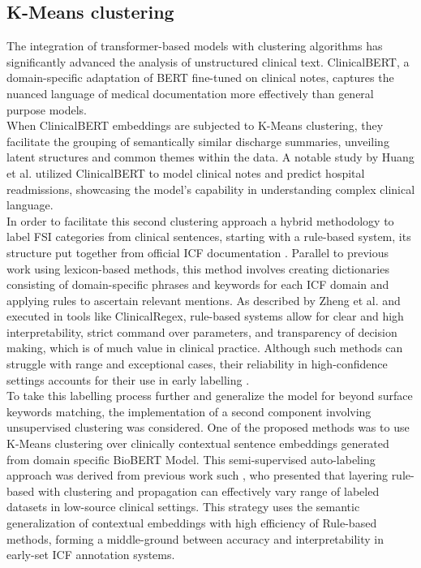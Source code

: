 \subsection{K-Means clustering}
The integration of transformer-based models with clustering algorithms has significantly advanced the analysis of unstructured clinical text. ClinicalBERT, a domain-specific adaptation of BERT fine-tuned on clinical notes, captures the nuanced language of medical documentation more effectively than general purpose models. \\

When ClinicalBERT embeddings are subjected to K-Means clustering, they facilitate the grouping of semantically similar discharge summaries, unveiling latent structures and common themes within the data. A notable study by Huang et al. \cite{huang2019} utilized ClinicalBERT to model clinical notes and predict hospital readmissions, showcasing the model's capability in understanding complex clinical language. \\

In order to facilitate this second clustering approach a hybrid methodology to label FSI categories from clinical sentences, starting with a rule-based system, its structure put together from official ICF documentation \cite{CommCognitionGuideline2023, InterpersonalGuideline2023, MobilityGuideline2023, SelfCareGuideline2023}. Parallel to previous work using lexicon-based methods, this method involves creating dictionaries consisting of domain-specific phrases and keywords for each ICF domain and applying rules to ascertain relevant mentions. As described by Zheng et al. \cite{zheng2010} and executed in tools like ClinicalRegex, rule-based systems allow for clear and high interpretability, strict command over parameters, and transparency of decision making, which is of much value in clinical practice. Although such methods can struggle with range and exceptional cases, their reliability in high-confidence settings accounts for their use in early labelling \cite{hong2020}. \\

To take this labelling process further and generalize the model for beyond surface keywords matching, the implementation of a second component involving unsupervised clustering was considered. One of the proposed methods was to use K-Means clustering over clinically contextual sentence embeddings generated from domain specific BioBERT Model. This semi-supervised auto-labeling approach was derived from previous work such \cite{eisman2021, greenes2018}, who presented that layering rule-based with clustering and propagation can effectively vary range of labeled datasets in low-source clinical settings.  This strategy uses the semantic generalization of contextual embeddings with high efficiency of Rule-based methods, forming a middle-ground between accuracy and interpretability in early-set ICF annotation systems. \\

